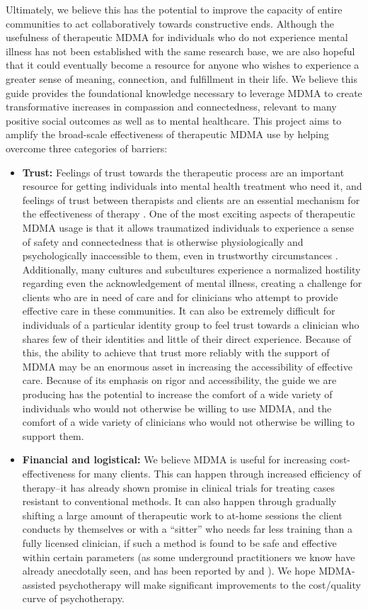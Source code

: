 \documentclass[12pt,letterpaper]{book}
\begin{document}
Ultimately, we believe this has the potential to improve the capacity of entire communities to act collaboratively towards constructive ends. Although the usefulness of therapeutic MDMA for individuals who do not experience mental illness has not been established with the same research base, we are also hopeful that it could eventually become a resource for anyone who wishes to experience a greater sense of meaning, connection, and fulfillment in their life. We believe this guide provides the foundational knowledge necessary to leverage MDMA to create transformative increases in compassion and connectedness, relevant to many positive social outcomes as well as to mental healthcare. This project aims to amplify the broad-scale effectiveness of therapeutic MDMA use by helping overcome three categories of barriers:
\begin{itemize}
    \item \textbf{Trust:} Feelings of trust towards the therapeutic process are an important resource for getting individuals into mental health treatment who need it, and feelings of trust between therapists and clients are an essential mechanism for the effectiveness of therapy \cite{wampoldCommonFactors}. One of the most exciting aspects of therapeutic MDMA usage is that it allows traumatized individuals to experience a sense of safety and connectedness that is otherwise physiologically and psychologically inaccessible to them, even in trustworthy circumstances \cite{fedduciaMDMAMemoryReconsolidation}. Additionally, many cultures and subcultures experience a normalized hostility regarding even the acknowledgement of mental illness, creating a challenge for clients who are in need of care and for clinicians who attempt to provide effective care in these communities. It can also be extremely difficult for individuals of a particular identity group to feel trust towards a clinician who shares few of their identities and little of their direct experience. Because of this, the ability to achieve that trust more reliably with the support of MDMA may be an enormous asset in increasing the accessibility of effective care. Because of its emphasis on rigor and accessibility, the guide we are producing has the potential to increase the comfort of a wide variety of individuals who would not otherwise be willing to use MDMA, and the comfort of a wide variety of clinicians who would not otherwise be willing to support them.
    \item \textbf{Financial and logistical:} We believe MDMA is useful for increasing cost-effectiveness for many clients. This can happen through increased efficiency of therapy–it has already shown promise in clinical trials for treating cases resistant to conventional methods. It can also happen through gradually shifting a large amount of therapeutic work to at-home sessions the client conducts by themselves or with a “sitter” who needs far less training than a fully licensed clinician, if such a method is found to be safe and effective within certain parameters (as some underground practitioners we know have already anecdotally seen, and has been reported by \textcite{colbertEvenings} and \textcite{hillsSolo}). We hope MDMA-assisted psychotherapy will make significant improvements to the cost/quality curve of psychotherapy.

\end{itemize}
\end{document}
